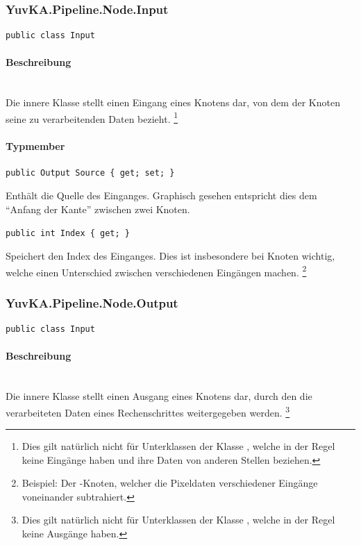 \subsubsection{YuvKA.Pipeline.Node.Input}

\begin{verbatim}
public class Input
\end{verbatim}

\paragraph{Beschreibung}~\\
Die innere Klasse  stellt einen Eingang eines Knotens dar, von dem der Knoten seine zu verarbeitenden Daten bezieht. \footnote{Dies gilt natürlich nicht für Unterklassen der Klasse , welche in der Regel keine Eingänge haben und ihre Daten von anderen Stellen beziehen.}

\paragraph{Typmember}
\begin{itemize}

	\begin{verbatim}
public Output Source { get; set; }
	\end{verbatim}
Enthält die Quelle des Einganges. Graphisch gesehen entspricht dies dem ``Anfang der Kante'' zwischen zwei Knoten.

	\begin{verbatim}
public int Index { get; }
	\end{verbatim}
Speichert den Index des Einganges. Dies ist insbesondere bei Knoten wichtig, welche einen Unterschied zwischen verschiedenen Eingängen machen. \footnote{Beispiel: Der -Knoten, welcher die Pixeldaten verschiedener Eingänge voneinander subtrahiert.}

\end{itemize}


\subsubsection{YuvKA.Pipeline.Node.Output}

\begin{verbatim}
public class Input
\end{verbatim}

\paragraph{Beschreibung}~\\
Die innere Klasse  stellt einen Ausgang eines Knotens dar, durch den die verarbeiteten Daten eines Rechenschrittes weitergegeben werden. \footnote{Dies gilt natürlich nicht für Unterklassen der Klasse , welche in der Regel keine Ausgänge haben.}

